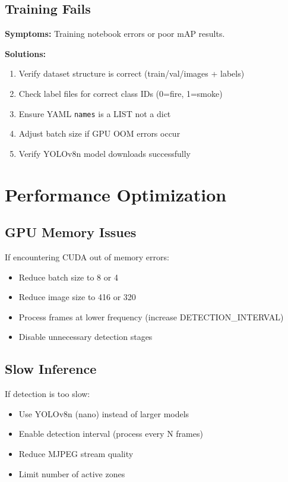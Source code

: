 \documentclass[12pt,a4paper,oneside]{book}
\begin{document}
\subsection{Training Fails}

\textbf{Symptoms:} Training notebook errors or poor mAP results.

\textbf{Solutions:}
\begin{enumerate}
    \item Verify dataset structure is correct (train/val/images + labels)
    \item Check label files for correct class IDs (0=fire, 1=smoke)
    \item Ensure YAML \texttt{names} is a LIST not a dict
    \item Adjust batch size if GPU OOM errors occur
    \item Verify YOLOv8n model downloads successfully
\end{enumerate}

\section{Performance Optimization}

\subsection{GPU Memory Issues}

If encountering CUDA out of memory errors:
\begin{itemize}
    \item Reduce batch size to 8 or 4
    \item Reduce image size to 416 or 320
    \item Process frames at lower frequency (increase DETECTION\_INTERVAL)
    \item Disable unnecessary detection stages
\end{itemize}

\subsection{Slow Inference}

If detection is too slow:
\begin{itemize}
    \item Use YOLOv8n (nano) instead of larger models
    \item Enable detection interval (process every N frames)
    \item Reduce MJPEG stream quality
    \item Limit number of active zones
\end{itemize}
\end{document}
